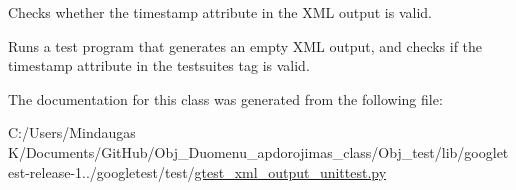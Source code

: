 \begin{DoxyVerb}Checks whether the timestamp attribute in the XML output is valid.

Runs a test program that generates an empty XML output, and checks if
the timestamp attribute in the testsuites tag is valid.
\end{DoxyVerb}
 

The documentation for this class was generated from the following file\+:\begin{DoxyCompactItemize}
\item 
C\+:/\+Users/\+Mindaugas K/\+Documents/\+Git\+Hub/\+Obj\+\_\+\+Duomenu\+\_\+apdorojimas\+\_\+class/\+Obj\+\_\+test/lib/googletest-\/release-\/1../googletest/test/\mbox{\hyperlink{_obj__test_2lib_2googletest-release-1_88_81_2googletest_2test_2gtest__xml__output__unittest_8py}{gtest\+\_\+xml\+\_\+output\+\_\+unittest.\+py}}\end{DoxyCompactItemize}
